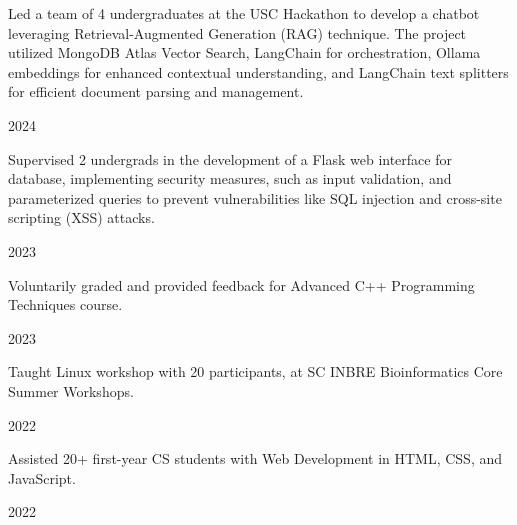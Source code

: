
\vspace{-0.7cm}

\begin{cvleadership}
        \hspace{0cm}
    \cvled
        {
            \begin{cvitems}
                \item {Led a team of 4 undergraduates at the USC Hackathon to develop a chatbot leveraging Retrieval-Augmented Generation (RAG) technique. The project utilized MongoDB Atlas Vector Search, LangChain for orchestration, Ollama embeddings for enhanced contextual understanding, and LangChain text splitters for efficient document parsing and management.}
            \end{cvitems}
        }
        {}
        {2024} %
    \cvled
        {
            \begin{cvitems}
                \item {Supervised 2 undergrads in the development of a Flask web interface for database, implementing security measures, such as input validation, and parameterized queries to prevent vulnerabilities like SQL injection and cross-site scripting (XSS) attacks.}
            \end{cvitems}
        }
        {}
        {2023} %
    \cvled
        {
            \begin{cvitems}
                \item {Voluntarily graded and provided feedback for Advanced C++ Programming Techniques course.}
            \end{cvitems}
        }
        {}
        {2023} %
    \cvled
        {
            \begin{cvitems}
                \item {Taught Linux workshop with 20 participants, at SC INBRE Bioinformatics Core Summer Workshops.}
            \end{cvitems}
        }
        {}
        {2022} %
    \cvled
        {
            \begin{cvitems}
                \item {Assisted 20+ first-year CS students with Web Development in HTML, CSS, and JavaScript.}
            \end{cvitems}
        }
        {}
        {2022} %
\end{cvleadership}
% 